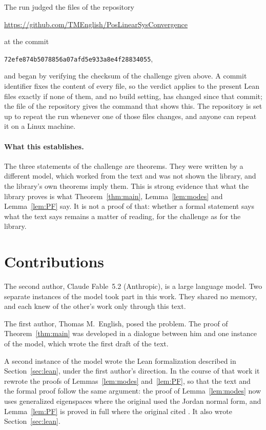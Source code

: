 \documentclass[11pt]{article}
\theoremstyle{definition}
\theoremstyle{remark}
\begin{document}
The run judged the files of the repository
\begin{center}
\url{https://github.com/TMEnglish/PosLinearSysConvergence}
\end{center}
at the commit
\begin{center}
\small\texttt{72efe874b5078856a07afd5e933a8e4f28834055},
\end{center}
and began by verifying the checksum of the challenge given above. A commit identifier fixes the
content of every file, so the verdict applies to the present Lean files exactly if none of them,
and no build setting, has changed since that commit; the file  of the repository
gives the command that shows this. The repository is set up to repeat the run whenever one of
those files changes, and anyone can repeat it on a Linux machine.

\paragraph{What this establishes.}
The three statements of the challenge are theorems. They were written by a different model,
which worked from the text and was not shown the library, and the library's own theorems imply
them. This is strong evidence that what the library proves is what
Theorem~\ref{thm:main}, Lemma~\ref{lem:modes} and Lemma~\ref{lem:PF} say. It is not a proof of
that: whether a formal statement says what the text says remains a matter of reading, for the
challenge as for the library.

\section*{Contributions}

The second author, Claude Fable~5.2 (Anthropic), is a large language model. Two separate
instances of the model took part in this work. They shared no memory, and each knew of the
other's work only through this text.

The first author, Thomas M.~English, posed the problem. The proof of Theorem~\ref{thm:main} was developed in a
dialogue between him and one instance of the model, which wrote the first draft of the text.

A second instance of the model wrote the Lean formalization described in Section~\ref{sec:lean}, under the
first author's direction. In the course of that work it rewrote the proofs of
Lemmas~\ref{lem:modes} and~\ref{lem:PF}, so that the text and the formal proof follow the same
argument: the proof of Lemma~\ref{lem:modes} now uses generalized eigenspaces where the original
used the Jordan normal form, and Lemma~\ref{lem:PF} is proved in full where the original cited
\cite[Theorem~8.3.1]{HJ}. It also wrote Section~\ref{sec:lean}.
\end{document}

